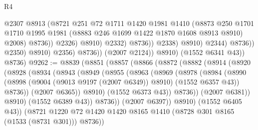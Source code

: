 \begin{lexlean}{R4}
\begin{coremodule}
                                            @2307
                                            @8913
                                            (@8721
                                              @251
                                              @72
                                              @1711
                                              @1420
                                              @1981
                                              @1410
                                              (@8873
                                                @250
                                                @1701
                                                @1710
                                                @1995
                                                @1981
                                                (@8883 @246 @1699 @1422 @1870 @1608 @8913 @8910)
                                                @2008)
                                              @8736))
                                          @2326)
                                        @8910)
                                      @2332)
                                    @8736))
                                @2338)
                              @8910)
                            @2344)
                          @8736))
                      @2350)
                    @8910)
                  @2356)
                @8736))
            (@2007 @2124))
          @8910)
        (@1552 @6341 @43))
      @8736)
@9262 := @8839
    (@8851
      (@8857
        (@8866
          (@8872
            (@8882
              (@8914
                (@8920
                  (@8928
                    (@8934
                      (@8943
                        (@8949
                          (@8955
                            (@8963
                              (@8969
                                (@8978
                                  (@8984
                                    (@8990
                                      (@8998
                                        (@9004 (@9013 @9197 (@2007 @6349)) @8910)
                                        (@1552 @6357 @43))
                                      @8736))
                                  (@2007 @6365))
                                @8910)
                              (@1552 @6373 @43))
                            @8736))
                        (@2007 @6381))
                      @8910)
                    (@1552 @6389 @43))
                  @8736))
              (@2007 @6397))
            @8910)
          (@1552 @6405 @43))
        (@8721 @1220 @72 @1420 @1420 @8165 @1410 (@8728 @301 @8165 (@1533 (@8731 @301))) @8736))

\end{coremodule}
\end{lexlean}
